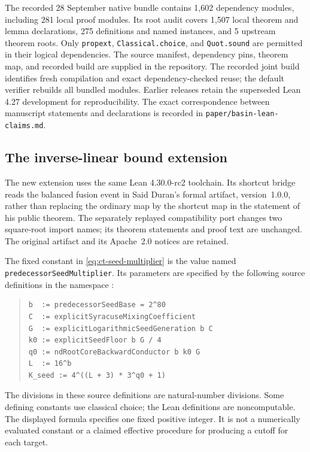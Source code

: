 \documentclass[11pt,a4paper]{article}
\begin{document}
The recorded 28 September native bundle contains 1,602 dependency modules,
including 281 local proof modules. Its root audit covers
1,507 local theorem and lemma declarations,
275 definitions and named instances, and
5 upstream theorem roots.
Only \texttt{propext}, \texttt{Classical.choice}, and
\texttt{Quot.sound} are permitted in their logical dependencies.
The source manifest, dependency pins, theorem map, and recorded build
are supplied in the repository. The recorded joint build identifies
fresh compilation and exact dependency-checked reuse; the default
verifier rebuilds all bundled modules. Earlier releases retain the
superseded Lean 4.27 development for reproducibility. The exact correspondence
between manuscript statements and declarations is recorded in
\texttt{paper/basin-lean-claims.md}.


\subsection{The inverse-linear bound extension}
\label{sec:ct-new-formal-scope}

The new extension uses the same Lean 4.30.0-rc2 toolchain. Its
shortcut bridge reads the balanced fusion event in Said Duran's
formal artifact, version~1.0.0, rather than replacing the ordinary
map by the shortcut map in the statement of his public theorem.
The separately replayed compatibility port changes two square-root
import names; its theorem statements and proof text are unchanged.
The original artifact and its Apache~2.0 notices are retained.

The fixed constant in \eqref{eq:ct-seed-multiplier} is the value named
\texttt{predecessorSeedMultiplier}. Its parameters are specified by
the following source definitions in the namespace
:
\begin{quote}\small
\begin{verbatim}
b  := predecessorSeedBase = 2^80
C  := explicitSyracuseMixingCoefficient
G  := explicitLogarithmicSeedGeneration b C
k0 := explicitSeedFloor b G / 4
q0 := ndRootCoreBackwardConductor b k0 G
L  := 16^b
K_seed := 4^((L + 3) * 3^q0 + 1)
\end{verbatim}
\end{quote}
The divisions in these source definitions are natural-number
divisions. Some defining constants use classical choice; the Lean
definitions are noncomputable. The displayed formula specifies one
fixed positive integer. It is not a numerically evaluated constant
or a claimed effective procedure for producing a cutoff for each
target.
\end{document}
